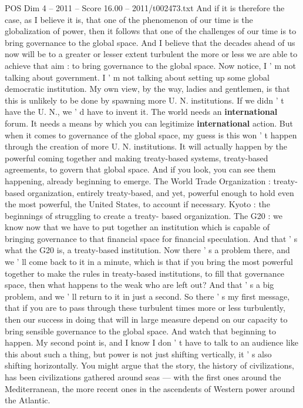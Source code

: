 \begin{textsample}{POS Dim 4 – 2011 – Score 16.00 – 2011/t002473.txt}
And if it is therefore the case, as I believe it is, that one of the phenomenon of our time is the globalization of power, then it follows that one of the challenges of our time is to bring governance to the global space.
And I believe that the decades ahead of us now will be to a greater or lesser extent turbulent the more or less we are able to achieve that aim : to bring governance to the global space.
Now notice, I ' m not talking about government.
I ' m not talking about setting up some global democratic institution.
My own view, by the way, ladies and gentlemen, is that this is unlikely to be done by spawning more U.
N. institutions.
If we didn ' t have the U.
N., we ' d have to invent it.
The world needs an \textbf{international} forum.
It needs a means by which you can legitimize \textbf{international} action.
But when it comes to governance of the global space, my guess is this won ' t happen through the creation of more U.
N. institutions.
It will actually happen by the powerful coming together and making treaty-based systems, treaty-based agreements, to govern that global space.
And if you look, you can see them happening, already beginning to emerge.
The World Trade Organization : treaty-based organization, entirely treaty-based, and yet, powerful enough to hold even the most powerful, the United States, to account if necessary.
Kyoto : the beginnings of struggling to create a treaty- based organization.
The G20 : we know now that we have to put together an institution which is capable of bringing governance to that financial space for financial speculation.
And that ' s what the G20 is, a treaty-based institution.
Now there ' s a problem there, and we ' ll come back to it in a minute, which is that if you bring the most powerful together to make the rules in treaty-based institutions, to fill that governance space, then what happens to the weak who are left out?
And that ' s a big problem, and we ' ll return to it in just a second.
So there ' s my first message, that if you are to pass through these turbulent times more or less turbulently, then our success in doing that will in large measure depend on our capacity to bring sensible governance to the global space.
And watch that beginning to happen.
My second point is, and I know I don ' t have to talk to an audience like this about such a thing, but power is not just shifting vertically, it ' s also shifting horizontally.
You might argue that the story, the history of civilizations, has been civilizations gathered around seas — with the first ones around the Mediterranean, the more recent ones in the ascendents of Western power around the Atlantic.

\end{textsample}
